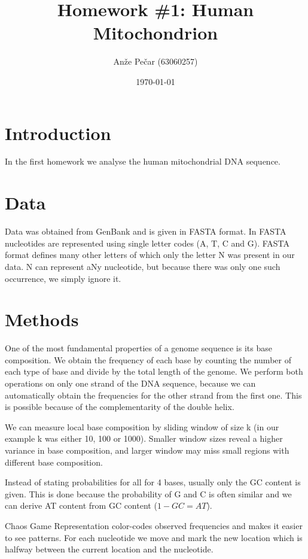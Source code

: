 \documentclass[a4paper,11pt]{article}
\title{Homework \#1: Human Mitochondrion}
\author{Anže Pečar (63060257)}
\date{\today}
\begin{document}
\maketitle

\section{Introduction}

In the first homework we analyse the human mitochondrial DNA sequence.   

\section{Data}

Data was obtained from GenBank and is given in FASTA format. In FASTA nucleotides are represented using single letter codes (A, T, C and G). FASTA format defines many other letters of which only the letter N was present in our data. N can represent aNy nucleotide, but because there was only one such occurrence, we simply ignore it. 

\section{Methods}
One of the most fundamental properties of a genome sequence is its base composition. We obtain the frequency of each base by counting the number of each type of base and divide by the total length of the genome. We perform both operations on only one strand of the DNA sequence, because we can automatically obtain the frequencies for the other strand from the first one. This is possible because of the complementarity of the double helix.

We can measure local base composition by sliding window of size k (in our example k was either 10, 100 or 1000). Smaller window sizes reveal a higher variance in base composition, and larger window may miss small regions with different base composition.

Instead of stating probabilities for all for 4 bases, usually only the GC content is given. This is done because the probability of G and C is often similar and we can derive AT content from GC content ($1 - GC = AT$). 

Chaos Game Representation color-codes observed frequencies and makes it easier to see patterns. For each nucleotide we move and mark the new location which is halfway between the current location and the nucleotide.
\end{document}

